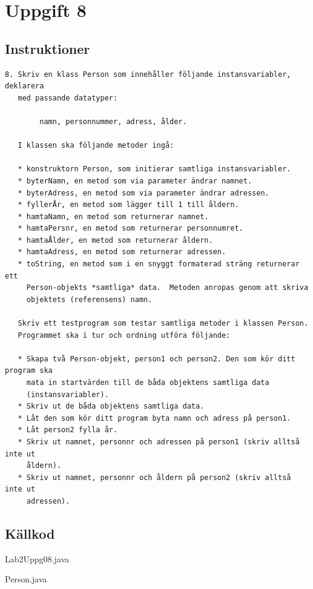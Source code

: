\section{Uppgift 8}\label{sec:uppg08}

\subsection{Instruktioner}
\begin{verbatim}
8. Skriv en klass Person som innehåller följande instansvariabler, deklarera
   med passande datatyper:

        namn, personnummer, adress, ålder.

   I klassen ska följande metoder ingå:

   * konstruktorn Person, som initierar samtliga instansvariabler.
   * byterNamn, en metod som via parameter ändrar namnet.
   * byterAdress, en metod som via parameter ändrar adressen.
   * fyllerÅr, en metod som lägger till 1 till åldern.
   * hamtaNamn, en metod som returnerar namnet.
   * hamtaPersnr, en metod som returnerar personnumret.
   * hamtaÅlder, en metod som returnerar åldern.
   * hamtaAdress, en metod som returnerar adressen.
   * toString, en metod som i en snyggt formaterad sträng returnerar ett
     Person-objekts *samtliga* data.  Metoden anropas genom att skriva
     objektets (referensens) namn.

   Skriv ett testprogram som testar samtliga metoder i klassen Person.
   Programmet ska i tur och ordning utföra följande:

   * Skapa två Person-objekt, person1 och person2. Den som kör ditt program ska
     mata in startvärden till de båda objektens samtliga data
     (instansvariabler).
   * Skriv ut de båda objektens samtliga data.
   * Låt den som kör ditt program byta namn och adress på person1.
   * Låt person2 fylla år.
   * Skriv ut namnet, personnr och adressen på person1 (skriv alltså inte ut
     åldern).
   * Skriv ut namnet, personnr och åldern på person2 (skriv alltså inte ut
     adressen).
\end{verbatim}


\subsection{Källkod}
\caption{Lab2Uppg08.java}
\label{src:uppg08}

\caption{Person.java}
\label{src:Person}


